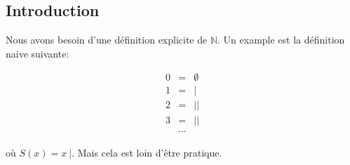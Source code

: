 \subsection{Introduction}

Nous avons besoin d'une définition explicite de $\mathbb{N}$.
Un example est la définition naive suivante:

\begin{eqnarray*}
    0 &=& \emptyset \\
    1 &=& |\\
    2 &=& ||\\
    3 &=& ||\\
      &\cdots&
\end{eqnarray*}

où $S(x) = x \ |$. Mais cela est loin d'être pratique.

